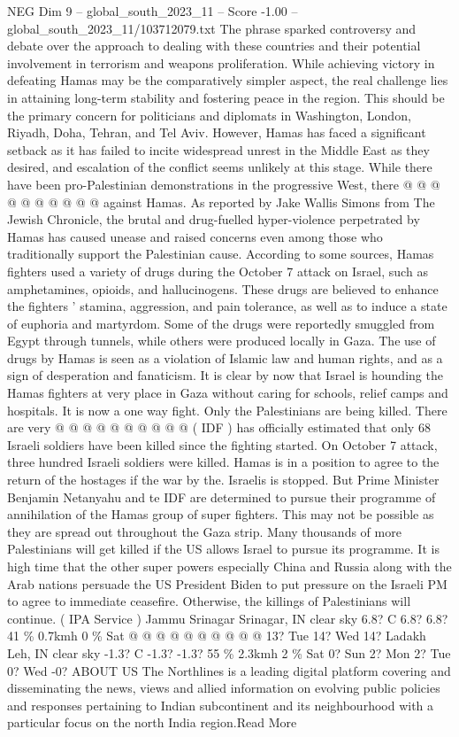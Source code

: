 \begin{textsample}{NEG Dim 9 – global\_south\_2023\_11 – Score -1.00 – global\_south\_2023\_11/103712079.txt}
The phrase sparked controversy and debate over the approach to dealing with these countries and their potential involvement in terrorism and weapons proliferation.
While achieving victory in defeating Hamas may be the comparatively simpler aspect, the real challenge lies in attaining long-term stability and fostering peace in the region.
This should be the primary concern for politicians and diplomats in Washington, London, Riyadh, Doha, Tehran, and Tel Aviv.
However, Hamas has faced a significant setback as it has failed to incite widespread unrest in the Middle East as they desired, and escalation of the conflict seems unlikely at this stage.
While there have been pro-Palestinian demonstrations in the progressive West, there @ @ @ @ @ @ @ @ @ @ against Hamas.
As reported by Jake Wallis Simons from The Jewish Chronicle, the brutal and drug-fuelled hyper-violence perpetrated by Hamas has caused unease and raised concerns even among those who traditionally support the Palestinian cause.
According to some sources, Hamas fighters used a variety of drugs during the October 7 attack on Israel, such as amphetamines, opioids, and hallucinogens.
These drugs are believed to enhance the fighters ' stamina, aggression, and pain tolerance, as well as to induce a state of euphoria and martyrdom.
Some of the drugs were reportedly smuggled from Egypt through tunnels, while others were produced locally in Gaza.
The use of drugs by Hamas is seen as a violation of Islamic law and human rights, and as a sign of desperation and fanaticism.
It is clear by now that Israel is hounding the Hamas fighters at very place in Gaza without caring for schools, relief camps and hospitals.
It is now a one way fight.
Only the Palestinians are being killed.
There are very @ @ @ @ @ @ @ @ @ @ ( IDF ) has officially estimated that only 68 Israeli soldiers have been killed since the fighting started.
On October 7 attack, three hundred Israeli soldiers were killed.
Hamas is in a position to agree to the return of the hostages if the war by the.
Israelis is stopped.
But Prime Minister Benjamin Netanyahu and te IDF are determined to pursue their programme of annihilation of the Hamas group of super fighters.
This may not be possible as they are spread out throughout the Gaza strip.
Many thousands of more Palestinians will get killed if the US allows Israel to pursue its programme.
It is high time that the other super powers especially China and Russia along with the Arab nations persuade the US President Biden to put pressure on the Israeli PM to agree to immediate ceasefire.
Otherwise, the killings of Palestinians will continue. ( IPA Service ) Jammu Srinagar Srinagar, IN clear sky 6.8?
C 6.8? 6.8? 41 \% 0.7kmh 0 \% Sat @ @ @ @ @ @ @ @ @ @ 13?
Tue 14?
Wed 14?
Ladakh Leh, IN clear sky -1.3?
C -1.3? -1.3? 55 \% 2.3kmh 2 \% Sat 0?
Sun 2?
Mon 2?
Tue 0?
Wed -0?
ABOUT US The Northlines is a leading digital platform covering and disseminating the news, views and allied information on evolving public policies and responses pertaining to Indian subcontinent and its neighbourhood with a particular focus on the north India region.Read More

\end{textsample}
